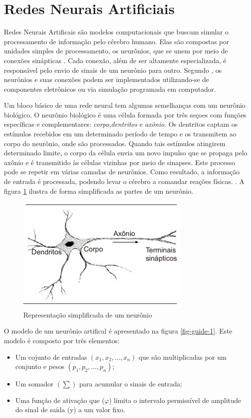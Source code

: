 \section{Redes Neurais Artificiais}
Redes Neurais Artificais são modelos computacionais que buscam simular o processamento de informação pelo cérebro humano. Elas são compostas por unidades simples de processamento, os neurônios, que se unem por meio de conexões sinápticas \cite{zhang1998}. Cada conexão, além de ser altamente especializada, é responsável pelo envio de sinais de um neurônio para outro. Segundo \cite{haykin2009}, os neurônios e suas conexões podem ser implementados utilizando-se de componentes eletrônicos ou via simulação programada em computador.

Um bloco básico de uma rede neural tem algumas semelhanças com um neurônio biológico. O neurônio biológico é uma célula formada por três seçoes com funções específicas e complementares: \textit{corpo},\textit{dentritos} e \textit{axônio}. Os dentritos captam os estímulos recebidos em um determinado período de tempo e os transmitem ao corpo do neurônio, onde são processados. Quando tais estímulos atingirem determinado limite, o corpo da célula envia um novo impulso que se propaga pelo axônio e é transmitido às células vizinhas por meio de sinapses.  Este processo pode se repetir em várias camadas de neurônios. Como resultado, a informação de entrada é processada, podendo levar o cérebro a comandar reações físicas.  \cite{ferneda2006}. A figura \ref{fig-neuronio} ilustra de forma simplificada as partes de um neurônio.

\begin{figure}[h]
	\centering
	\includegraphics[scale=0.5]{pasta1_figuras/neuronio.png}
	\caption{Representação simplificada de um neurônio}
	\label{fig-neuronio}
\end{figure}

O modelo de um neurônio artifical é apresentado na figura \ref{fig-guide-1}. Este modelo é composto por três elementos:
\begin{itemize}
	\item Um cojunto de entradas $(x_1,x_2,...,x_n)$ que são multiplicadas por um conjunto e pesos $(p_1,p_2,...,p_n)$;
	\item Um somador $(\sum)$ para acumular o sinais de entrada;
	\item Uma função de ativação que ($\varphi$) limita o intervalo permissível de amplitude do sinal de saída (y) a um valor fixo.
\end{itemize}

